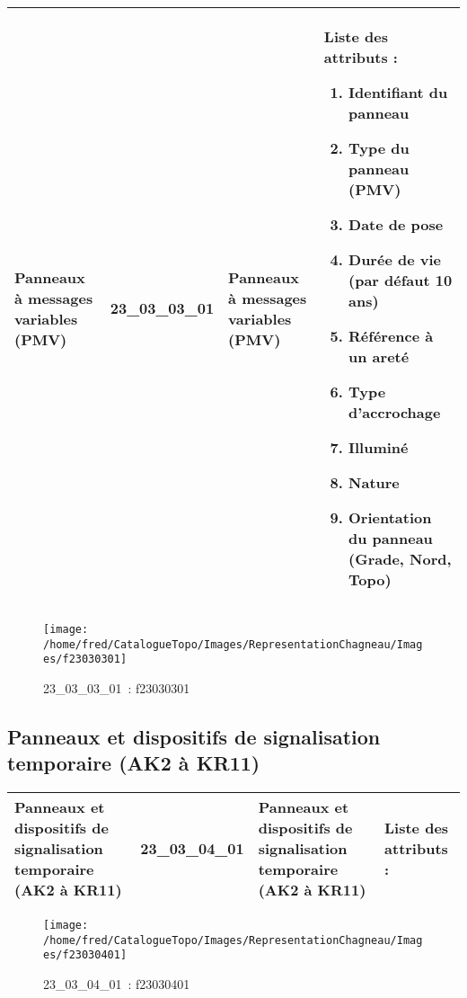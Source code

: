 \documentclass[12pt,titlepage]{book}
\begin{document}
\renewcommand{\arraystretch}{1.2}
\begin{supertabular}{|p{10cm}|c|p{13cm}|p{12cm}|}
 Panneaux à messages variables (PMV) & 23\_03\_03\_01 & Panneaux à messages variables (PMV) & Liste des attributs :
\begin{enumerate}
  \item Identifiant du panneau  \item Type du panneau (PMV)  \item Date de pose  \item Durée de vie (par défaut 10 ans)  \item Référence à un areté  \item Type d'accrochage  \item Illuminé  \item Nature  \item Orientation du panneau (Grade, Nord, Topo)\end{enumerate}
\\
\hline
\end{supertabular}
\begin{figure}[h!]
  \hfill         %
  \begin{minipage}[t]{3cm}
    \begin{center}
      \texttt{[image: /home/fred/CatalogueTopo/Images/RepresentationChagneau/Images/f23030301]}
      \caption[~23\_03\_03\_01]{\small{23\_03\_03\_01~:} \tiny{f23030301}}\label{f23030301}
    \end{center}
  \end{minipage}
\end{figure}


\subsection{Panneaux et dispositifs de signalisation temporaire (AK2 à KR11)}
\noindent
\vspace{\baselineskip}

\renewcommand{\arraystretch}{1.2}
\begin{supertabular}{|p{10cm}|c|p{13cm}|p{12cm}|}
 Panneaux et dispositifs de signalisation temporaire (AK2 à KR11) & 23\_03\_04\_01 & Panneaux et dispositifs de signalisation temporaire (AK2 à KR11) & Liste des attributs :
\begin{enumerate}
\end{enumerate}
\\
\hline
\end{supertabular}
\begin{figure}[h!]
  \hfill         %
  \begin{minipage}[t]{3cm}
    \begin{center}
      \texttt{[image: /home/fred/CatalogueTopo/Images/RepresentationChagneau/Images/f23030401]}
      \caption[~23\_03\_04\_01]{\small{23\_03\_04\_01~:} \tiny{f23030401}}\label{f23030401}
    \end{center}
  \end{minipage}
\end{figure}
\end{document}
